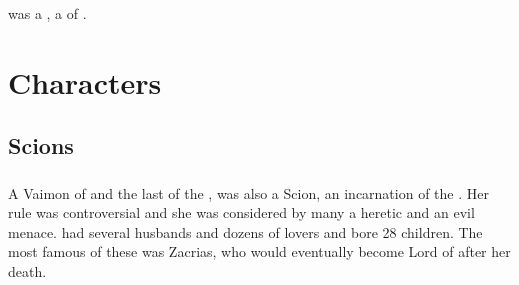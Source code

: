 \section{\DulNepherRamas}
\index{\DulNepherRamas}
\DulNepherRamas was a \sphyle, a  of \Shurco.























\part{\Human Characters}























\chapter{Scions}















\section{\Belzir}
\index{\Belzir}
A Vaimon of \ClanGeican and the last \Calipha of the \VaimonCaliphate, \Belzir{} was also a Scion, an incarnation of the \Malach{} \Shiaraid. Her rule was controversial and she was considered by many a heretic and an evil menace. \Belzir{} had several husbands and dozens of lovers and bore 28 children. The most famous of these was Zacrias, who would eventually become Lord of \ClanGeican after her death. 


